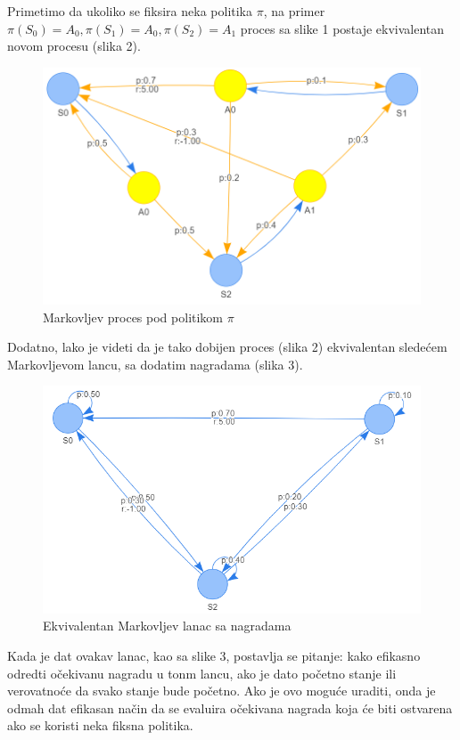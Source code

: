\documentclass[a4paper,fleqn,12pt]{JMThesis}
\theoremstyle{plain}
\theoremstyle{definition}
\theoremstyle{definition}
\begin{document}
Primetimo da ukoliko se fiksira neka politika $\pi$, na primer $\pi(S_0)=A_0, \pi(S_1)=A_0, \pi(S_2)=A_1$ proces sa slike 1 postaje ekvivalentan novom procesu (slika 2).
\begin{figure}[!ht]
	\centering
	\includegraphics[scale=0.4]{../graph-visuals/example-mdp-given-policy.png}
	\caption{Markovljev proces pod politikom $\pi$}
\end{figure}

Dodatno, lako je videti da je tako dobijen proces (slika 2) ekvivalentan sledećem Markovljevom lancu, sa dodatim nagradama (slika 3).
\begin{figure}[!ht]
	\centering
	\includegraphics[scale=0.4]{../graph-visuals/example-mdp-given-policy-chain.png}
	\caption{Ekvivalentan Markovljev lanac sa nagradama}
\end{figure}
Kada je dat ovakav lanac, kao sa slike 3, postavlja se pitanje: kako efikasno odredti očekivanu nagradu u tonm lancu, ako je dato početno stanje ili verovatnoće da svako stanje bude početno. Ako je ovo moguće uraditi, onda je odmah dat efikasan način da se evaluira očekivana nagrada koja će biti ostvarena ako se koristi neka fiksna politika.\\
\end{document}

